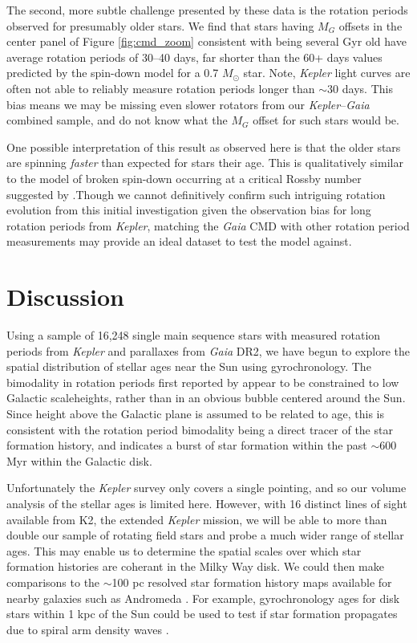 \documentclass[preprint2]{aastex62}
\newcommand{\Kepler}{\textsl{Kepler}\xspace}
\begin{document}
The second, more subtle challenge presented by these data is the rotation periods observed for presumably older stars. 
We find that stars having $M_G$ offsets in the center panel of Figure \ref{fig:cmd_zoom} consistent with being several Gyr old have average rotation periods of 30--40 days, far shorter than the 60+ days values predicted by the spin-down model for a 0.7 $M_\odot$ star.  Note, \Kepler light curves are often not able to reliably measure rotation periods longer than $\sim$30 days. This bias means we may be missing even slower rotators from our \Kepler--{\em Gaia} combined sample, and do not know what the $M_G$ offset for such stars would be. 


One possible interpretation of this result as observed here is that the older stars are spinning {\it faster} than expected for stars their age. This is qualitatively similar to the model of broken spin-down occurring at a critical Rossby number suggested by \citet{van-saders2016}.Though we cannot definitively confirm such intriguing rotation evolution from this initial investigation given the observation bias for long rotation periods from \Kepler, matching the {\em Gaia} CMD with other rotation period measurements may provide an ideal dataset to test the \citet{van-saders2016} model against. 





\vspace{0.5in}
\section{Discussion}

Using a sample of 16,248 single main sequence stars with measured rotation periods from \Kepler and parallaxes from {\em Gaia} DR2, we have begun to explore the spatial distribution of stellar ages near the Sun using gyrochronology. The bimodality in rotation periods first reported by \citet{mcquillan2013} appear to be constrained to low Galactic scaleheights, rather than in an obvious bubble centered around the Sun. Since height above the Galactic plane is assumed to be related to age, this is consistent with the rotation period bimodality being a direct tracer of the star formation history, and indicates a burst of star formation within the past $\sim$600 Myr within the Galactic disk.


Unfortunately the \Kepler survey only covers a single pointing, and so our volume analysis of the stellar ages is limited here. However, with 16 distinct lines of sight available from K2, the extended \Kepler mission, we will be able to more than double our sample of rotating field stars and probe a much wider range of stellar ages. This may enable us to determine the spatial scales over which star formation histories are coherant in the Milky Way disk. We could then make comparisons to the $\sim$100 pc resolved star formation history maps available for nearby galaxies such as Andromeda \citep[][]{lewis2015,williams2017}. For example, gyrochronology ages for disk stars within 1 kpc of the Sun could be used to test if star formation propagates due to spiral arm density waves \citep[e.g. see][]{choi2015}.
\end{document}
